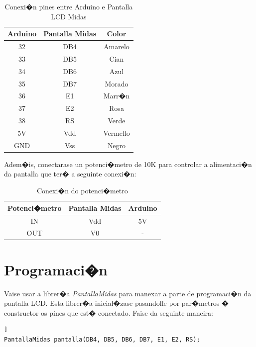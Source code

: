 \documentclass[11pt,twoside]{book}
\begin{document}
\begin{table}[htbt]
\begin{center}
\begin{tabular}{|c|c|c|}
\hline
Arduino & Pantalla Midas & Color \\
\hline
32 & DB4 & Amarelo \\
\hline
33 & DB5 & Cian\\
\hline
34 & DB6 & Azul \\
\hline
35 & DB7 & Morado \\
\hline
36 & E1 & Marr�n \\
\hline
37 & E2 & Rosa \\
\hline
38 & RS & Verde \\
\hline
5V & Vdd & Vermello \\
\hline
GND & Vss & Negro \\
\hline
\end{tabular}
\caption{Conexi�n pines entre Arduino e Pantalla LCD Midas}
\label{TablaArduinoPantalla}
\end{center}
\end{table}

Adem�is, conectarase un potenci�metro de 10K para controlar a alimentaci�n da pantalla que ter� a seguinte conexi�n:

\begin{table}[htbt]
\begin{center}
\begin{tabular}{|c|c|c|}
\hline
Potenci�metro & Pantalla Midas & Arduino\\
\hline
IN & Vdd & 5V \\
\hline
OUT & V0 & -\\
\hline
\end{tabular}
\caption{Conexi�n do potenci�metro}
\label{TablaPotenciometro}
\end{center}
\end{table}

\section{Programaci�n}

Vaise usar a librer�a \textit{PantallaMidas} para manexar a parte de programaci�n da pantalla LCD. Esta librer�a inicial�zase pasandolle por par�metros � constructor os pines que est� conectado. Faise da seguinte maneira:

\begin{lstlisting}] 
PantallaMidas pantalla(DB4, DB5, DB6, DB7, E1, E2, RS);
\end{lstlisting}
\end{document}
